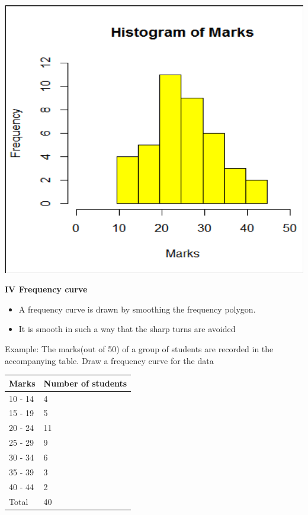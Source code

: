 \documentclass[]{book}
\providecommand{\tightlist}{%
  \setlength{\itemsep}{0pt}\setlength{\parskip}{0pt}}
\begin{document}
\begin{center}\includegraphics[width=1\linewidth]{figure/hist} \end{center}

\textbf{IV Frequency curve}

\begin{itemize}
\tightlist
\item
  A frequency curve is drawn by smoothing the frequency polygon.
\item
  It is smooth in such a way that the sharp turns are avoided
\end{itemize}

Example: The marks(out of 50) of a group of students are recorded in the accompanying table. Draw a frequency curve for the data

\begin{longtable}[]{@{}ll@{}}
\toprule
Marks & Number of students\tabularnewline
\midrule
\endhead
10 - 14 & 4\tabularnewline
15 - 19 & 5\tabularnewline
20 - 24 & 11\tabularnewline
25 - 29 & 9\tabularnewline
30 - 34 & 6\tabularnewline
35 - 39 & 3\tabularnewline
40 - 44 & 2\tabularnewline
Total & 40\tabularnewline
\bottomrule
\end{longtable}
\end{document}
